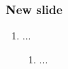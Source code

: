 \documentclass[usenames,dvipsnames]{beamer}
\begin{document}
%
%
%

\begin{frame}
\frametitle{New slide}

\begin{enumerate}[{~~$\boldsymbol{\bullet}$}]

\item
...

\begin{enumerate}[{$\boldsymbol{\rightarrow}$}]
\renewcommand{\itemsep}{0.9ex}

\item
...
\end{enumerate}


\end{enumerate}
\end{frame}





%  
%  
%  
\end{document}
